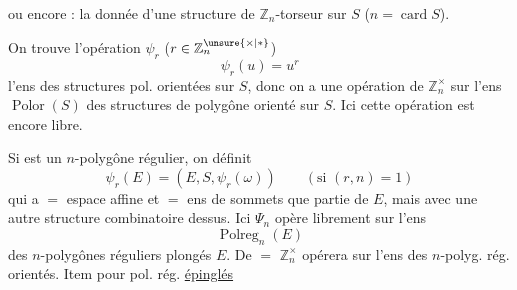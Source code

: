 ou encore : la donnée d'une structure de $\mathbb Z_n$-torseur sur $S$ ($n=\operatorname{card}S$).

On trouve l'opération $\psi_r$ ($r\in\mathbb Z_n^{\unsure{\times|*}}$) 
\[
\psi_r(u)=u^r\tag*{(25)}
\]
 l'ens des structures pol. orientées sur $S$, donc on a une opération de $\mathbb Z_n^\times$ sur l'ens $\operatorname{Polor}(S)$ des structures de polygône orienté sur $S$. Ici cette opération est encore libre.

Si  est un $n$-polygône régulier, on définit 
\[
\psi_r(E)=(E,S,\psi_r(\omega))\qquad(\text{si }(r,n)=1)\tag*{(26)}
\]
qui a $=$ espace affine  et $=$ ens de sommets   que partie de $E$, mais avec une autre structure combinatoire dessus. Ici $\Psi_n$ opère librement sur l'ens
\[
\operatorname{Polreg}_n(E)
\]
des $n$-polygônes réguliers plongés  $E$. De $=$ $\mathbb Z_n^\times$ opérera  sur l'ens des $n$-polyg. rég. orientés. Item pour pol. rég. \uline{épinglés}
